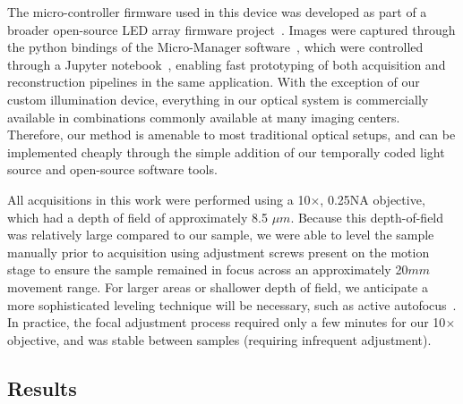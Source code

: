 The micro-controller firmware used in this device was developed as part of a broader open-source LED array firmware project~\cite{illuminate}. Images were captured through the python bindings of the Micro-Manager software~\cite{micromanager}, which were controlled through a Jupyter notebook~\cite{Kluyver:2016aa}, enabling fast prototyping of both acquisition and reconstruction pipelines in the same application. With the exception of our custom illumination device, everything in our optical system is commercially available in combinations commonly available at many imaging centers. Therefore, our method is amenable to most traditional optical setups, and can be implemented cheaply through the simple addition of our temporally coded light source and open-source software tools.

All acquisitions in this work were performed using a 10$\times$, 0.25NA objective, which had a depth of field of approximately 8.5 $\mu m$. Because this depth-of-field was relatively large compared to our sample, we were able to level the sample manually prior to acquisition using adjustment screws present on the motion stage to ensure the sample remained in focus across an approximately 20$mm$ movement range. For larger areas or shallower depth of field, we anticipate a more sophisticated leveling technique will be necessary, such as active autofocus~\cite{nikonperfect, zeissdefinite}. In practice, the focal adjustment process required only a few minutes for our 10$\times$ objective, and was stable between samples (requiring infrequent adjustment).

\subsection{Results}\label{sec:highthroughput:results}
